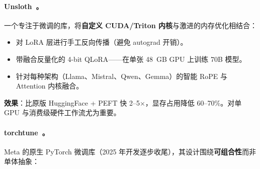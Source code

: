 \paragraph{Unsloth~\cite{unsloth2024}。}
\label{unsloth-.}

一个专注于微调的库，将\textbf{自定义 CUDA/Triton 内核}与激进的内存优化相结合：

\begin{itemize}
  \item 对 LoRA 层进行手工反向传播（避免 autograd 开销）。
  \item 带融合反量化的 4-bit QLoRA——在单张 48~GB GPU 上训练 70B 模型。
  \item 针对每种架构（Llama、Mistral、Qwen、Gemma）的智能 RoPE 与 Attention 内核融合。
\end{itemize}

\textbf{效果}：比原版 HuggingFace + PEFT 快 2--5$\times$，显存占用降低 60--70\%。对单 GPU 与消费级硬件工作流尤为重要。

\paragraph{torchtune~\cite{torchtune2024}。}
\label{torchtune-.}

Meta 的原生 PyTorch 微调库（2025 年开发逐步收尾），其设计围绕\textbf{可组合性}而非单体抽象：

